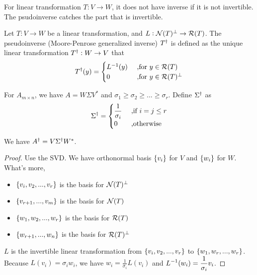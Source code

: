 For linear transformation $T: V \rightarrow W$, it does not have inverse if it is not invertible. The psudoinverse catches the part that is invertible.

\begin{definition}[Pseudoinverse]
    Let $T: V \rightarrow W$ be a linear transformation, and $L: \mathcal{N}(T)^\perp \rightarrow \mathcal{R}(T)$. The pseudoinverse (Moore-Penrose generalized inverse) ${T}^\dagger$ is defined as the unique linear transformation ${T}^\dagger: W \rightarrow V$ that
    \begin{equation}
        {T}^\dagger(y) = \begin{aligned}
            \begin{cases}
                {L}^{-1}(y) & \text{ ,for } y \in \mathcal{R}(T) \\
                0 & \text{ ,for } y \in \mathcal{R}(T)^\perp
            \end{cases}
        \end{aligned}
    \end{equation}
    
    
    For $A_{m \times n}$, we have $A = W \Sigma V^*$ and $\sigma_1 \geq \sigma_2 \geq ... \geq \sigma_r$. Define ${\Sigma}^\dagger$ as 
    \begin{equation}
        {\Sigma}^\dagger = \begin{aligned}
            \begin{cases}
                \displaystyle \frac{1}{\sigma_i} & \text{ ,if } i = j \leq r \\
                0 & \text{ ,otherwise}
            \end{cases}
        \end{aligned}
    \end{equation}
    
    We have ${A}^\dagger = V {\Sigma}^\dagger W^*$.
\end{definition}
\begin{proof}
    Use the SVD. We have orthonormal basis $\set{v_i}$ for $V$ and $\set{w_i}$ for $W$. What's more,
    \begin{itemize}
        \item $\set{v_i, v_2, ..., v_r}$ is the basis for $\mathcal{N}(T)^\perp$
        \item $\set{v_{r+1}, ..., v_m}$ is the basis for $\mathcal{N}(T)$
        \item $\set{w_1, w_2, ..., w_r}$ is the basis for $\mathcal{R}(T)$
        \item $\set{w_{r+1}, ..., w_n}$ is the basis for $\mathcal{R}(T)^\perp$
    \end{itemize}
    
    $L$ is the invertible linear transformation from $\set{v_i, v_2, ..., v_r}$ to $\set{w_1, w_r, ..., w_r}$. Because $L(v_i) = \sigma_i w_i$, we have $\displaystyle w_i = \frac{1}{\sigma_i}L(v_i)$ and $\displaystyle {L}^{-1}(w_i) = \frac{1}{\sigma_i} v_i$.
\end{proof}

